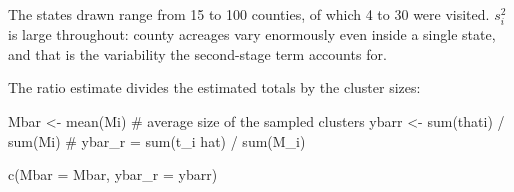 \documentclass[
  letterpaper,
  DIV=11,
  numbers=noendperiod]{scrreprt}
\newenvironment{Shaded}{\begin{snugshade}}{\end{snugshade}}
\newcommand{\AttributeTok}[1]{\textcolor[rgb]{0.40,0.45,0.13}{#1}}
\newcommand{\CommentTok}[1]{\textcolor[rgb]{0.37,0.37,0.37}{#1}}
\newcommand{\FunctionTok}[1]{\textcolor[rgb]{0.28,0.35,0.67}{#1}}
\newcommand{\NormalTok}[1]{\textcolor[rgb]{0.00,0.23,0.31}{#1}}
\newcommand{\OtherTok}[1]{\textcolor[rgb]{0.00,0.23,0.31}{#1}}
\newcommand{\SpecialCharTok}[1]{\textcolor[rgb]{0.37,0.37,0.37}{#1}}
\renewcommand{\[}{\begin{equation}}
\renewcommand{\]}{\end{equation}}
\begin{document}
\begin{table}

\caption{\label{tbl-agpop-cluster-summary}Cluster-level summaries for
the 10 sampled states}


\end{table}%

The states drawn range from 15 to 100 counties, of which 4 to 30 were
visited. \(s_i^2\) is large throughout: county acreages vary enormously
even inside a single state, and that is the variability the second-stage
term accounts for.

The ratio estimate divides the estimated totals by the cluster sizes:

\begin{Shaded}
\begin{Highlighting}[]
\NormalTok{Mbar  }\OtherTok{\textless{}{-}} \FunctionTok{mean}\NormalTok{(Mi)                  }\CommentTok{\# average size of the sampled clusters}
\NormalTok{ybarr }\OtherTok{\textless{}{-}} \FunctionTok{sum}\NormalTok{(thati) }\SpecialCharTok{/} \FunctionTok{sum}\NormalTok{(Mi)      }\CommentTok{\# ybar\_r = sum(t\_i hat) / sum(M\_i)}

\FunctionTok{c}\NormalTok{(}\AttributeTok{Mbar =}\NormalTok{ Mbar, }\AttributeTok{ybar\_r =}\NormalTok{ ybarr)}
\end{Highlighting}
\end{Shaded}
\end{document}
